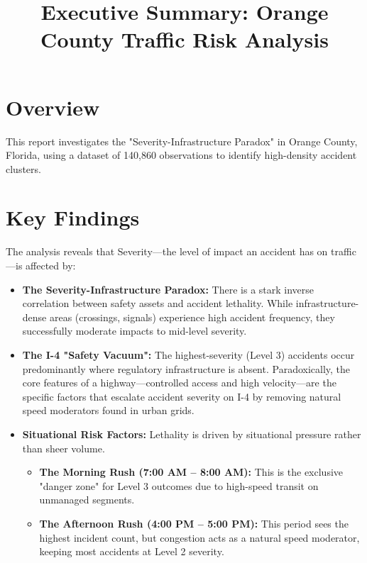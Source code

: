 \documentclass[12pt]{article}
\title{\vspace{-4em}\textbf{Executive Summary: Orange County Traffic Risk Analysis}}
\author{}
\date{}
\begin{document}
	
	\maketitle
	\vspace{-4em}
	
	\section*{Overview}
	This report investigates the "Severity-Infrastructure Paradox" in Orange County, Florida, using a dataset of 140,860 observations to identify high-density accident clusters.
	
	\section*{Key Findings}
	The analysis reveals that Severity---the level of impact an accident has on traffic---is affected by:
	
	\begin{itemize}[nosep] %
		\item \textbf{The Severity-Infrastructure Paradox:} There is a stark inverse correlation between safety assets and accident lethality. While infrastructure-dense areas (crossings, signals) experience high accident frequency, they successfully moderate impacts to mid-level severity.
		\item \textbf{The I-4 "Safety Vacuum":} The highest-severity (Level 3) accidents occur predominantly where regulatory infrastructure is absent. Paradoxically, the core features of a highway—controlled access and high velocity—are the specific factors that escalate accident severity on I-4 by removing natural speed moderators found in urban grids.
		\item \textbf{Situational Risk Factors:} Lethality is driven by situational pressure rather than sheer volume.
		\begin{itemize}[nosep]
			\item \textbf{The Morning Rush (7:00 AM – 8:00 AM):} This is the exclusive "danger zone" for Level 3 outcomes due to high-speed transit on unmanaged segments.
			\item \textbf{The Afternoon Rush (4:00 PM – 5:00 PM):} This period sees the highest incident count, but congestion acts as a natural speed moderator, keeping most accidents at Level 2 severity.
		\end{itemize}
	\end{itemize}
	
\end{document}
